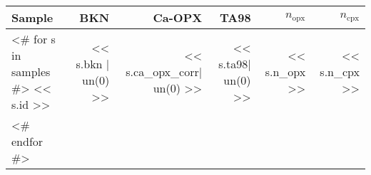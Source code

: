 \begin{tabular}{l r r r r r}
\hline
 Sample  & BKN & Ca-OPX & TA98 & $n_\textrm{opx}$ & $n_\textrm{cpx}$  \\
\hline
<# for s in samples  #>
  << s.id >> &
  << s.bkn | un(0) >> &
  << s.ca_opx_corr| un(0) >> &
  << s.ta98| un(0) >> &
  << s.n_opx >> &
  << s.n_cpx >> \\
<# endfor  #>
\hline
\end{tabular}
